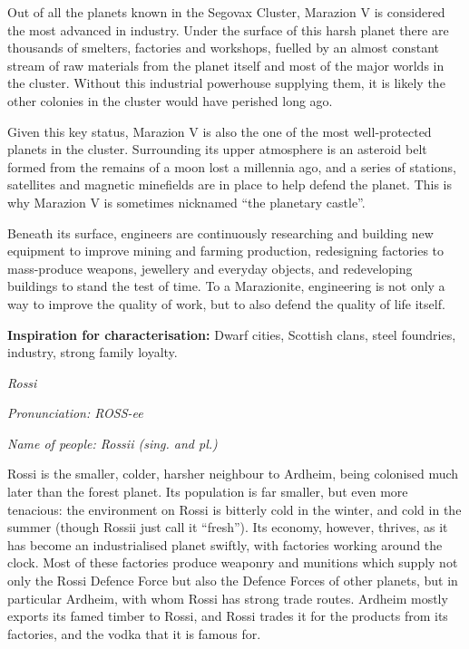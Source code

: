 \documentclass{scrbook}
\begin{document}
Out of all the planets known in the Segovax Cluster, Marazion V is considered the most advanced in industry. Under the surface of this harsh planet there are thousands of smelters, factories and workshops, fuelled by an almost constant stream of raw materials from the planet itself and most of the major worlds in the cluster. Without this industrial powerhouse supplying them, it is likely the other colonies in the cluster would have perished long ago.

Given this key status, Marazion V is also the one of the most well-protected planets in the cluster. Surrounding its upper atmosphere is an asteroid belt formed from the remains of a moon lost a millennia ago, and a series of stations, satellites and magnetic minefields are in place to help defend the planet. This is why Marazion V is sometimes nicknamed ``the planetary castle''.

Beneath its surface, engineers are continuously researching and building new equipment to improve mining and farming production, redesigning factories to mass-produce weapons, jewellery and everyday objects, and redeveloping buildings to stand the test of time. To a Marazionite, engineering is not only a way to improve the quality of work, but to also defend the quality of life itself.

\textbf{Inspiration for characterisation:} Dwarf cities, Scottish clans, steel foundries, industry, strong family loyalty.

\textit{Rossi}

\textit{Pronunciation: ROSS-ee}

\textit{Name of people: Rossii (sing. and pl.)}

Rossi is the smaller, colder, harsher neighbour to Ardheim, being colonised much later than the forest planet. Its population is far smaller, but even more tenacious: the environment on Rossi is bitterly cold in the winter, and cold in the summer (though Rossii just call it ``fresh''). Its economy, however, thrives, as it has become an industrialised planet swiftly, with factories working around the clock. Most of these factories produce weaponry and munitions which supply not only the Rossi Defence Force but also the Defence Forces of other planets, but in particular Ardheim, with whom Rossi has strong trade routes. Ardheim mostly exports its famed timber to Rossi, and Rossi trades it for the products from its factories, and the vodka that it is famous for.
\end{document}
